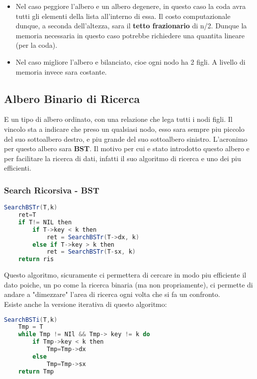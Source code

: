 \begin{itemize}
	\item Nel caso peggiore l'albero e un albero degenere, in questo caso la coda avra tutti gli elementi della lista all'interno di essa. Il costo computazionale dunque, a seconda dell'altezza, sara il \textbf{tetto frazionario} di n/2. Dunque la memoria necessaria in questo caso potrebbe richiedere una quantita lineare (per la coda).
	\item Nel caso migliore l'albero e bilanciato, cioe ogni nodo ha 2 figli. A livello di memoria invece sara costante.
\end{itemize}

\subsection{Albero Binario di Ricerca}
E un tipo di albero ordinato, con una relazione che lega tutti i nodi figli. Il vincolo sta a indicare che preso un qualsiasi nodo, esso sara sempre piu piccolo del suo sottoalbero destro, e piu grande del suo sottoalbero sinistro.
L'acronimo per questo albero sara \textbf{BST}. Il motivo per cui e stato introdotto questo albero e per facilitare la ricerca di dati, infatti il suo algoritmo di ricerca e uno dei piu efficienti.

\subsubsection{Search Ricorsiva - BST}

\begin{lstlisting}[language=Java]
	SearchBSTr(T,k)
	ret=T
	if T!= NIL then
		if T->key < k then
			ret = SearchBSTr(T->dx, k)
		else if T->key > k then
			ret = SearchBSTr(T-sx, k)
	return ris	
\end{lstlisting}

Questo algoritmo, sicuramente ci permettera di cercare in modo piu efficiente il dato poiche, un po come la ricerca binaria (ma non propriamente), ci permette di andare a "dimezzare" l'area di ricerca ogni volta che si fa un confronto.\\

Esiste anche la versione iterativa di questo algoritmo:

\begin{lstlisting}[language=Java]
	SearchBSTi(T,k)
	Tmp = T
	while Tmp != NIl && Tmp-> key != k do
		if Tmp->key < k then
			Tmp=Tmp->dx
		else
			Tmp=Tmp->sx
	return Tmp	
\end{lstlisting}

